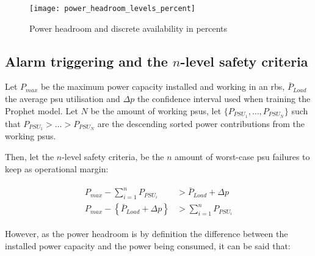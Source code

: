 
\begin{figure}[hptb]
	\centering
	\texttt{[image: power\_headroom\_levels\_percent]}
	\caption{Power headroom and discrete availability in percents}
	\label{fig:ph_lvls}
\end{figure}

\pagebreak
\subsection{Alarm triggering and the $n$-level safety criteria}

Let $P_{max}$ be the maximum power capacity installed and working in an \ac{rbs},  $\bar{P}_{Load}$ the average \ac{psu} utilisation and $\Delta p$ the confidence interval used when training the Prophet model. Let $N$ be the amount of working \acp{psu}, let $\{P_{PSU_1}, \ldots, P_{PSU_N}\}$ such that $P_{PSU_1} > \ldots > P_{PSU_N}$ are the descending sorted power contributions from the working \acp{psu}.

Then, let the $n$-level safety criteria, be the $n$ amount of worst-case \ac{psu} failures to keep as operational margin:

\begin{align}
	\begin{split}
		P_{max} - \sum_{i=1}^{n}{P_{PSU_i}} &> \bar{P}_{Load} + \Delta p \\
		P_{max} - \left\{\bar{P}_{Load} + \Delta p \right\} &> \sum_{i=1}^{n}{P_{PSU_i}}
	\end{split}
\end{align}

However, as the power headroom is by definition the difference between the installed power capacity and the power being consumed, it can be said that: 

